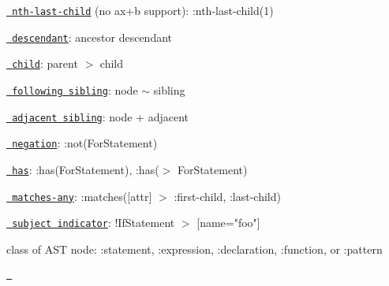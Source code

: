 \begin{DoxyItemize}
\item \href{http://dev.w3.org/csswg/selectors4/\#the-nth-last-child-pseudo}{\texttt{ nth-\/last-\/child}} (no ax+b support)\+: {\ttfamily \+:nth-\/last-\/child(1)}
\item \href{http://dev.w3.org/csswg/selectors4/\#descendant-combinators}{\texttt{ descendant}}\+: {\ttfamily ancestor descendant}
\item \href{http://dev.w3.org/csswg/selectors4/\#child-combinators}{\texttt{ child}}\+: {\ttfamily parent \texorpdfstring{$>$}{>} child}
\item \href{http://dev.w3.org/csswg/selectors4/\#general-sibling-combinators}{\texttt{ following sibling}}\+: {\ttfamily node \texorpdfstring{$\sim$}{\string~} sibling}
\item \href{http://dev.w3.org/csswg/selectors4/\#adjacent-sibling-combinators}{\texttt{ adjacent sibling}}\+: {\ttfamily node + adjacent}
\item \href{http://dev.w3.org/csswg/selectors4/\#negation-pseudo}{\texttt{ negation}}\+: {\ttfamily \+:not(\+For\+Statement)}
\item \href{https://drafts.csswg.org/selectors-4/\#has-pseudo}{\texttt{ has}}\+: {\ttfamily \+:has(\+For\+Statement)}, {\ttfamily \+:has(\texorpdfstring{$>$}{>} For\+Statement)}
\item \href{http://dev.w3.org/csswg/selectors4/\#matches}{\texttt{ matches-\/any}}\+: {\ttfamily \+:matches(\mbox{[}attr\mbox{]} \texorpdfstring{$>$}{>} \+:first-\/child, \+:last-\/child)}
\item \href{http://dev.w3.org/csswg/selectors4/\#subject}{\texttt{ subject indicator}}\+: {\ttfamily !\+If\+Statement \texorpdfstring{$>$}{>} \mbox{[}name="{}foo"{}\mbox{]}}
\item class of AST node\+: {\ttfamily \+:statement}, {\ttfamily \+:expression}, {\ttfamily \+:declaration}, {\ttfamily \+:function}, or {\ttfamily \+:pattern}
\end{DoxyItemize}

\href{https://travis-ci.org/estools/esquery}{\texttt{ }} 